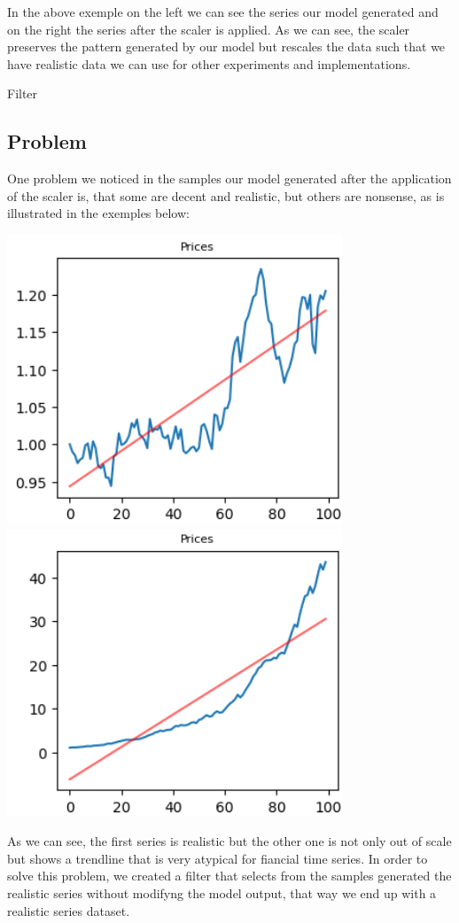 \documentclass{article}
\begin{document}
    In the above exemple on the left we can see the series our model generated and on the right the series after the scaler is applied. As we can see,  
    the scaler preserves the pattern generated by our model but rescales the data such that we have realistic data we can use for other experiments and implementations.



\begin{center}
    {\huge{Filter}}
\end{center}    
    \begin{multicols}{2}
    \section*{Problem}
    One problem we noticed in the samples our model generated after the application of the scaler is, that some are decent and realistic, but others are 
    nonsense, as is illustrated in the exemples below:
    \begin{center}
        \includegraphics[scale=0.49]{imgs/serie_comp_1.png}
        \includegraphics[scale=0.49]{imgs/serie_comp_2.png}
    \end{center}
    As we can see, the first series is realistic but the other one is not only out of scale but shows a trendline that is very 
    atypical for fiancial time series. In order to solve this problem, we created a filter that selects from the samples generated the realistic series without modifyng the model output, that way we end up with a realistic series dataset.

\end{multicols}
\end{document}
